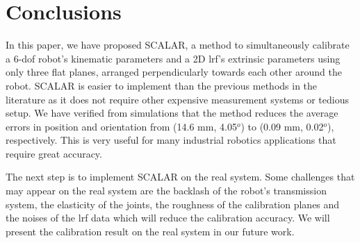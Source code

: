 \section{Conclusions}
\label{sec:conclusions}

In this paper, we have proposed SCALAR, a method to simultaneously calibrate a 6-\ac{dof} robot's kinematic parameters and a 2D \ac{lrf}'s extrinsic parameters using only three flat planes, arranged perpendicularly towards each other around the robot. SCALAR is easier to implement than the previous methods in the literature as it does not require other expensive measurement systems or tedious setup. We have verified from simulations that the method reduces the average errors in position and orientation from (14.6 mm, 4.05$^o$) to (0.09 mm, 0.02$^o$), respectively. This is very useful for many industrial robotics applications that require great accuracy. 

The next step is to implement SCALAR on the real system. Some challenges that may appear on the real system are the backlash of the robot's transmission system, the elasticity of the joints, the roughness of the calibration planes and the noises of the \ac{lrf} data which will reduce the calibration accuracy. We will present the calibration result on the real system in our future work. 